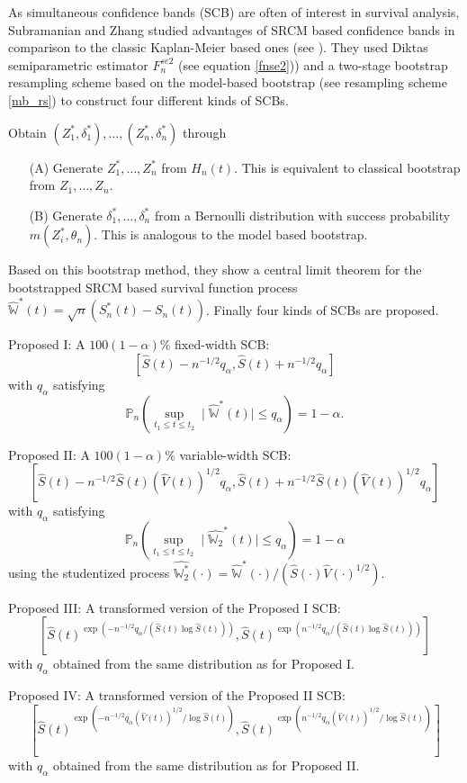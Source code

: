 As simultaneous confidence bands (SCB) are often of interest in survival analysis, Subramanian and Zhang studied advantages of SRCM based confidence bands in comparison to the classic Kaplan-Meier based ones (see \cite{PAPER5}). They used Diktas semiparametric estimator $F_n^{se2}$ (see equation \ref{fnse2})) and a two-stage bootstrap resampling scheme based on the model-based bootstrap (see resampling scheme \ref{mb_rs}) to construct four different kinds of SCBs.
\begin{resampling_scheme}\label{2stage_rs}
Obtain $ (Z_1^*,\delta_1^*),\ldots,(Z_n^*,\delta_n^*) $ through
\begin{enumerate}
\item[(A)] Generate $Z_1^*,\ldots,Z_n^*$ from $H_n(t)$. This is equivalent to classical bootstrap from  $Z_1,\ldots,Z_n$.
\item[(B)] Generate $\delta_1^*,\ldots,\delta_n^*$ from a Bernoulli distribution with success probability $m(Z_i^*,\theta_n)$. This is analogous to the model based bootstrap.
\end{enumerate}
\end{resampling_scheme}
Based on this bootstrap method, they show a central limit theorem for the bootstrapped SRCM based survival function process $\hat{\mathbb{W}}^*(t) = \sqrt{n} (S_n^*(t)-S_n(t))$.
Finally four kinds of SCBs are proposed.

Proposed I: A $100(1-\alpha)$\% fixed-width SCB:
\[ \left[\hat{S}(t) - n^{-1/2}q_{\alpha}, \hat{S}(t) + n^{-1/2}q_{\alpha}\right]\] with $q_{\alpha}$ satisfying
\[ \mathbb{P}_n\left( \sup_{t_1\leq t \leq t_2} \mid\hat{\mathbb{W}}^*(t)\mid \leq q_{\alpha} \right) = 1 - \alpha.\]

Proposed II: A $100(1-\alpha)$\% variable-width SCB:
\[ \left[\hat{S}(t) - n^{-1/2}\hat{S}(t)(\hat{V}(t))^{1/2}q_{\alpha}, \hat{S}(t) + n^{-1/2}\hat{S}(t)(\hat{V}(t))^{1/2}q_{\alpha}\right]\]
with $q_{\alpha}$ satisfying 
\[ \mathbb{P}_n\left( \sup_{t_1\leq t \leq t_2} \mid\hat{\mathbb{W}_2}^*(t)\mid \leq q_{\alpha} \right) = 1 - \alpha\] 
using the studentized process $\hat{\mathbb{W}_2^*}(\cdotp) = \hat{\mathbb{W}}^*(\cdotp)/(\hat{S}(\cdotp)\hat{V}(\cdotp)^{1/2})$.

Proposed III: A transformed version of the Proposed I SCB:
\[ \left[\hat{S}(t)^{\exp(-n^{-1/2}q_{\alpha}/(\hat{S}(t)\log\hat{S}(t)))}, \hat{S}(t)^{\exp(n^{-1/2}q_{\alpha}/(\hat{S}(t)\log\hat{S}(t)))}\right]\]
with $q_{\alpha}$ obtained from the same distribution as for Proposed I.

Proposed IV: A transformed version of the Proposed II SCB:
\[ \left[\hat{S}(t)^{\exp(-n^{-1/2}q_{\alpha}(\hat{V}(t))^{1/2}/\log\hat{S}(t))}, \hat{S}(t)^{\exp(n^{-1/2}q_{\alpha}(\hat{V}(t))^{1/2}/\log\hat{S}(t))}\right]\]
with $q_{\alpha}$  obtained from the same distribution as for Proposed II.

